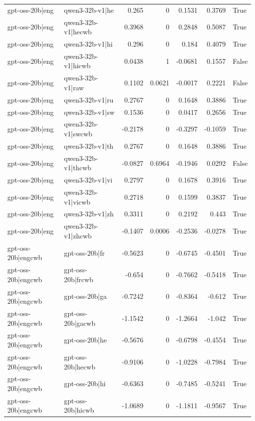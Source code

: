 \begin{table}
\begin{tabular}{l l r r r r l}
gpt-oss-20b|eng & qwen3-32b-v1|he & 0.265 & 0 & 0.1531 & 0.3769 & True \\
gpt-oss-20b|eng & qwen3-32b-v1|hecwb & 0.3968 & 0 & 0.2848 & 0.5087 & True \\
gpt-oss-20b|eng & qwen3-32b-v1|hi & 0.296 & 0 & 0.184 & 0.4079 & True \\
gpt-oss-20b|eng & qwen3-32b-v1|hicwb & 0.0438 & 1 & -0.0681 & 0.1557 & False \\
gpt-oss-20b|eng & qwen3-32b-v1|raw & 0.1102 & 0.0621 & -0.0017 & 0.2221 & False \\
gpt-oss-20b|eng & qwen3-32b-v1|ru & 0.2767 & 0 & 0.1648 & 0.3886 & True \\
gpt-oss-20b|eng & qwen3-32b-v1|sw & 0.1536 & 0 & 0.0417 & 0.2656 & True \\
gpt-oss-20b|eng & qwen3-32b-v1|swcwb & -0.2178 & 0 & -0.3297 & -0.1059 & True \\
gpt-oss-20b|eng & qwen3-32b-v1|th & 0.2767 & 0 & 0.1648 & 0.3886 & True \\
gpt-oss-20b|eng & qwen3-32b-v1|thcwb & -0.0827 & 0.6964 & -0.1946 & 0.0292 & False \\
gpt-oss-20b|eng & qwen3-32b-v1|vi & 0.2797 & 0 & 0.1678 & 0.3916 & True \\
gpt-oss-20b|eng & qwen3-32b-v1|vicwb & 0.2718 & 0 & 0.1599 & 0.3837 & True \\
gpt-oss-20b|eng & qwen3-32b-v1|zh & 0.3311 & 0 & 0.2192 & 0.443 & True \\
gpt-oss-20b|eng & qwen3-32b-v1|zhcwb & -0.1407 & 0.0006 & -0.2536 & -0.0278 & True \\
gpt-oss-20b|engcwb & gpt-oss-20b|fr & -0.5623 & 0 & -0.6745 & -0.4501 & True \\
gpt-oss-20b|engcwb & gpt-oss-20b|frcwb & -0.654 & 0 & -0.7662 & -0.5418 & True \\
gpt-oss-20b|engcwb & gpt-oss-20b|ga & -0.7242 & 0 & -0.8364 & -0.612 & True \\
gpt-oss-20b|engcwb & gpt-oss-20b|gacwb & -1.1542 & 0 & -1.2664 & -1.042 & True \\
gpt-oss-20b|engcwb & gpt-oss-20b|he & -0.5676 & 0 & -0.6798 & -0.4554 & True \\
gpt-oss-20b|engcwb & gpt-oss-20b|hecwb & -0.9106 & 0 & -1.0228 & -0.7984 & True \\
gpt-oss-20b|engcwb & gpt-oss-20b|hi & -0.6363 & 0 & -0.7485 & -0.5241 & True \\
gpt-oss-20b|engcwb & gpt-oss-20b|hicwb & -1.0689 & 0 & -1.1811 & -0.9567 & True \\

\end{tabular}
\end{table}
